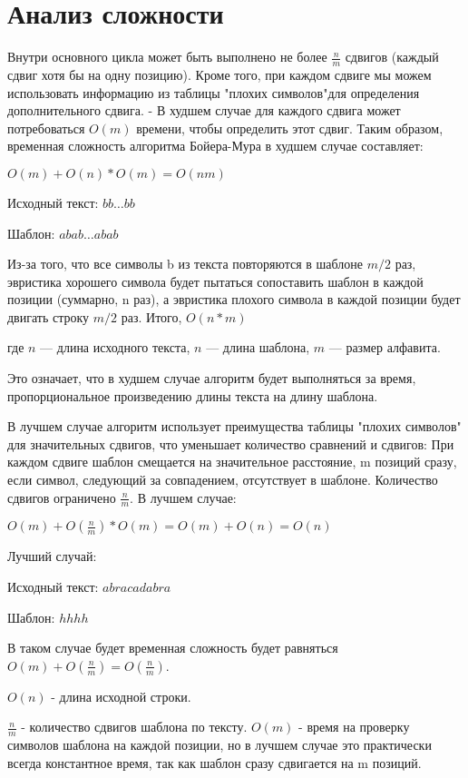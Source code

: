\documentclass[otchet]{SCWorks}
\begin{document}
\section{Анализ сложности}
Внутри основного цикла может быть выполнено не более $\frac{n}{m}$ сдвигов (каждый сдвиг хотя бы на одну позицию).
Кроме того, при каждом сдвиге мы можем использовать информацию из таблицы "плохих символов"для определения дополнительного сдвига. 
- В худшем случае для каждого сдвига может потребоваться $O(m)$ времени, чтобы определить этот сдвиг.
Таким образом, временная сложность алгоритма Бойера-Мура в худшем случае составляет:


$O(m) + O(n) * O(m) = O(nm)$

Исходный текст: $bb…bb$

Шаблон: $abab…abab$

Из-за того, что все символы b из текста повторяются в шаблоне $m/2$ раз, эвристика хорошего символа будет пытаться сопоставить шаблон в каждой позиции (суммарно, n раз), 
а эвристика плохого символа в каждой позиции будет двигать строку $m/2$ раз. Итого, $O(n*m)$

где $n$ — длина исходного текста, $n$ — длина шаблона, $m$ — размер алфавита.

Это означает, что в худшем случае алгоритм будет выполняться за время, пропорциональное произведению длины текста на длину шаблона.

В лучшем случае алгоритм использует преимущества таблицы "плохих символов" для значительных сдвигов, что уменьшает количество сравнений и сдвигов: При каждом сдвиге шаблон смещается на значительное расстояние, m позиций сразу, если символ, следующий за совпадением, отсутствует в шаблоне. Количество сдвигов ограничено  $\frac{n}{m}$. 
В лучшем случае:

$O(m) + O(\frac{n}{m}) * O(m) = O(m) + O(n) = O(n)$

Лучший случай:

Исходный текст: $abracadabra$

Шаблон: $hhhh$

В таком случае будет временная сложность будет равняться $O(m) + O(\frac{n}{m}) = O(\frac{n}{m})$.

$O(n)$ - длина исходной строки.

$\frac{n}{m}$ - количество сдвигов шаблона по тексту. $O(m)$ - время на проверку символов шаблона на каждой позиции, но в лучшем случае это практически всегда константное время, так как шаблон сразу сдвигается на m позиций.


	


\appendix
\end{document}
